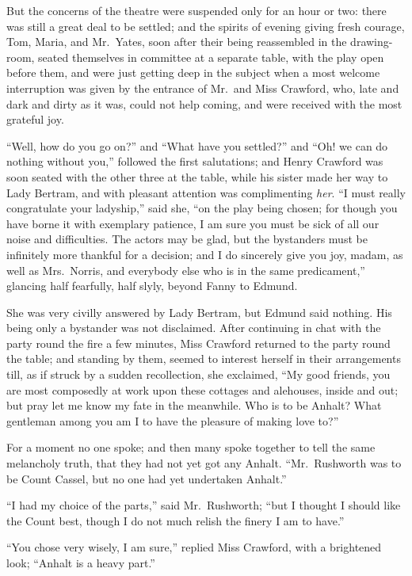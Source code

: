 But the concerns of the theatre were suspended only for an
hour or two:  there was still a great deal to be settled;
and the spirits of evening giving fresh courage, Tom, Maria,
and Mr.\ Yates, soon after their being reassembled
in the drawing-room, seated themselves in committee
at a separate table, with the play open before them,
and were just getting deep in the subject when a most
welcome interruption was given by the entrance of Mr.\ and
Miss Crawford, who, late and dark and dirty as it was,
could not help coming, and were received with the most grateful
joy.

``Well, how do you go on?'' and ``What have you settled?''
and ``Oh! we can do nothing without you,'' followed the
first salutations; and Henry Crawford was soon seated
with the other three at the table, while his sister made
her way to Lady Bertram, and with pleasant attention
was complimenting \emph{her}.  ``I must really congratulate
your ladyship,'' said she, ``on the play being chosen;
for though you have borne it with exemplary patience, I am
sure you must be sick of all our noise and difficulties.
The actors may be glad, but the bystanders must be infinitely
more thankful for a decision; and I do sincerely give
you joy, madam, as well as Mrs.\ Norris, and everybody else
who is in the same predicament,'' glancing half fearfully,
half slyly, beyond Fanny to Edmund.

She was very civilly answered by Lady Bertram,
but Edmund said nothing.  His being only a bystander was
not disclaimed.  After continuing in chat with the party
round the fire a few minutes, Miss Crawford returned
to the party round the table; and standing by them,
seemed to interest herself in their arrangements till,
as if struck by a sudden recollection, she exclaimed,
``My good friends, you are most composedly at work upon
these cottages and alehouses, inside and out; but pray let
me know my fate in the meanwhile.  Who is to be Anhalt?
What gentleman among you am I to have the pleasure of making
love to?''

For a moment no one spoke; and then many spoke together
to tell the same melancholy truth, that they had not yet
got any Anhalt.  ``Mr.\ Rushworth was to be Count Cassel,
but no one had yet undertaken Anhalt.''

``I had my choice of the parts,'' said Mr.\ Rushworth;
``but I thought I should like the Count best, though I do
not much relish the finery I am to have.''

``You chose very wisely, I am sure,'' replied Miss Crawford,
with a brightened look; ``Anhalt is a heavy part.''

